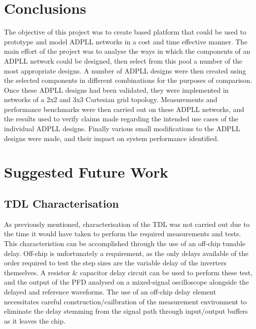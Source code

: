 \section{Conclusions}
The objective of this project was to create  based platform that could be used to prototype and model \ac{ADPLL} networks in a cost and time effective manner. The main effort of the project was to analyse the ways in which the components of an \ac{ADPLL} network could be designed, then select from this pool a number of the most appropriate designs. A number of \ac{ADPLL} designs were then created using the selected components in different combinations for the purposes of comparison. Once these \ac{ADPLL} designs had been validated, they were implemented in networks of a 2x2 and 3x3 Cartesian grid topology. Measurements and performance benchmarks were then carried out on these \ac{ADPLL} networks, and the results used to verify claims made regarding the intended use cases of the individual \ac{ADPLL} designs. Finally various small modifications to the \ac{ADPLL} designs were made, and their impact on system performance identified.



\section{Suggested Future Work}
\subsection{\acl{TDL} Characterisation}
As previously mentioned, characterisation of the \ac{TDL} was not carried out due to the time it would have taken to perform the required measurements and tests. This characteristion can be accomplished through the use of an off-chip tunable delay. Off-chip is unfortunately a requirement, as the only delays available of the order required to test the step sizes are the variable delay of the inverters themselves. A resistor \& capacitor delay circuit can be used to perform these test, and the output of the \ac{PFD} analysed on a mixed-signal oscilloscope alongside the delayed and reference waveforms. The use of an off-chip delay element necessitates careful construction/cailbration of the measurement environment to eliminate the delay stemming from the signal path through input/output buffers as it leaves the chip.

